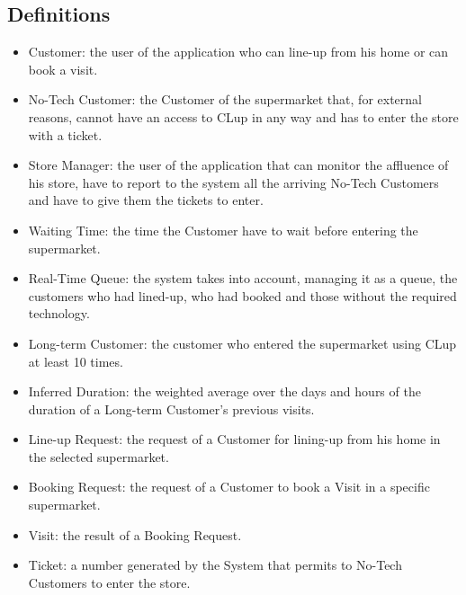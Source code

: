 \subsection{Definitions}

\begin{itemize}
	\item Customer: the user of the application who can line-up from his home or can book a visit.
	\item No-Tech Customer: the Customer of the supermarket that, for external reasons, cannot have an access to CLup in any way and has to enter the store with a ticket.
	\item Store Manager: the user of the application that can monitor the affluence of his store, have to report to the system all the arriving No-Tech Customers and have to give them the tickets to enter.
	\item Waiting Time: the time the Customer have to wait before entering the supermarket.
	\item Real-Time Queue: the system takes into account, managing it as a queue, the customers who had lined-up, who had booked and those without the required technology.
	\item Long-term Customer: the customer who entered the supermarket using CLup at least 10 times.
	\item Inferred Duration: the weighted average over the days and hours of the duration of a Long-term Customer's previous visits.
	\item Line-up Request: the request of a Customer for lining-up from his home in the selected supermarket.
	\item Booking Request: the request of a Customer to book a Visit in a specific supermarket.
	\item Visit: the result of a Booking Request.
	\item Ticket: a number generated by the System that permits to No-Tech Customers to enter the store.
\end{itemize}



 
 